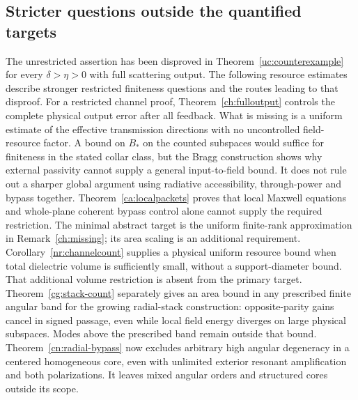 \subsection{Stricter questions outside the quantified targets}
\label{ver:gaps}
The unrestricted assertion has been disproved in
Theorem~\ref{uc:counterexample} for every $\delta>\eta>0$ with full
scattering output. The following resource estimates describe stronger
restricted finiteness questions and the routes leading to that disproof.
For a restricted channel proof, Theorem~\ref{ch:fulloutput} controls the
complete physical output error after all feedback. What is missing is
a uniform estimate of the effective transmission directions with no
uncontrolled field-resource factor. A bound on $B_*$ on the counted
subspaces would suffice for finiteness in the stated collar class, but
the Bragg construction shows why external passivity cannot supply a
general input-to-field bound. It does not rule out a sharper global
argument using radiative accessibility, through-power and bypass together.
Theorem~\ref{ca:localpackets} proves that local Maxwell equations and
whole-plane coherent bypass control alone cannot supply the required
restriction. The minimal abstract target is
the uniform finite-rank approximation in Remark~\ref{ch:missing};
its area scaling is an additional requirement.
Corollary~\ref{nr:channelcount} supplies a physical uniform resource
bound when total dielectric volume is sufficiently small, without a
support-diameter bound. That additional volume restriction is absent
from the primary target. Theorem~\ref{cg:stack-count} separately gives
an area bound in any prescribed finite angular band for the growing
radial-stack construction: opposite-parity gains cancel in signed
passage, even while local field energy diverges on large physical
subspaces. Modes above the prescribed band remain outside that bound.
Theorem~\ref{cn:radial-bypass} now excludes arbitrary high angular
degeneracy in a centered homogeneous core, even with unlimited exterior
resonant amplification and both polarizations. It leaves mixed angular
orders and structured cores outside its scope.

